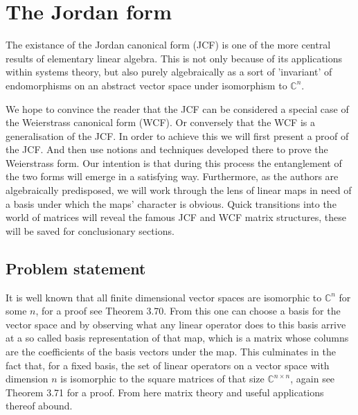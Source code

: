 \section{The Jordan form}

The existance of the Jordan canonical form (JCF) is one of the more central results of elementary linear algebra.
This is not only because of its applications within systems theory, but also purely algebraically as a sort of 'invariant' of endomorphisms on an abstract vector space under isomorphism to \( \mathbb{C}^n   \).

We hope to convince the reader that the JCF can be considered a special case of the Weierstrass canonical form (WCF). 
Or conversely that the WCF is a generalisation of the JCF.
In order to achieve this we will first present a proof of the JCF.
And then use notions and techniques developed there to prove the Weierstrass form. Our intention is that during this process the entanglement of the two forms will emerge in a satisfying way. 
Furthermore, as the authors are algebraically predisposed, we will work through the lens of linear maps in need of a basis under which the maps' character is obvious.
Quick transitions into the world of matrices will reveal the famous JCF and WCF matrix structures, these will be saved for conclusionary sections.


\subsection{Problem statement}

It is well known that all finite dimensional vector spaces are isomorphic to \( \mathbb{C}^n\) for some $n$, for a proof see \cite{axler2024linear} Theorem 3.70. From this one can choose a basis for the vector space and by observing what any linear operator does to this basis arrive at a so called basis representation of that map, which is a matrix whose columns are the coefficients of the basis vectors under the map. This culminates in the fact that, for a fixed basis, the set of linear operators on a vector space with dimension \(n\) is isomorphic to the square matrices of that size \( \mathbb{C}^{n \times n}\), again see \cite{axler2024linear} Theorem 3.71 for a proof. From here matrix theory and useful applications thereof abound.

